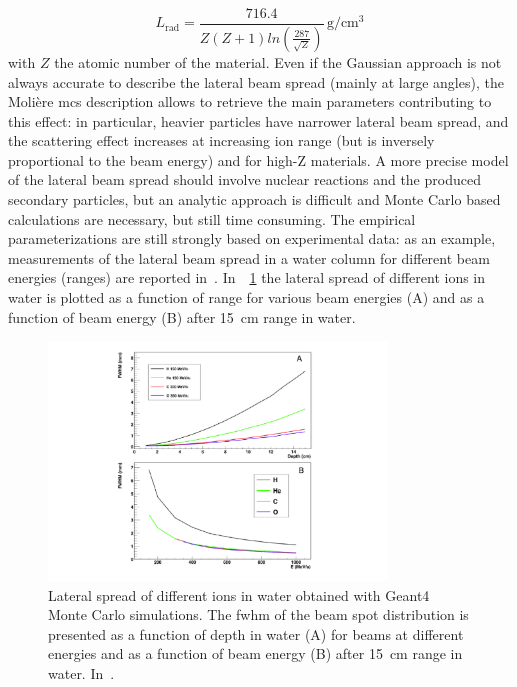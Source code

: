 \begin{equation}
L_{\mathrm{rad}} = \frac{716.4}{Z(Z+1)ln(\frac{287}{\sqrt{Z}})} \, \mathrm{g / cm^{3}}
\label{chap1::eq::radL}
\end{equation}
with $Z$ the atomic number of the material.
Even if the Gaussian approach is not always accurate to describe the lateral beam spread (mainly at large angles), the Moli\`{e}re \gls{mcs} description allows to retrieve the main parameters contributing to this effect: in particular, heavier particles have narrower lateral beam spread, and the scattering effect increases at increasing ion range (but is inversely proportional to the beam energy) and for high-Z materials. A more precise model of the lateral beam spread should involve nuclear reactions and the produced secondary particles, but an analytic approach is difficult and Monte Carlo based calculations are necessary, but still time consuming. The empirical parameterizations are still strongly based on experimental data: as an example, measurements of the lateral beam spread in a water column for different beam energies (ranges) are reported in~\cite{Pedroni2005}. In~\figurename~\ref{chap1::fig::latSpread} the lateral spread of different ions in water is plotted as a function of range for various beam energies (A) and as a function of beam energy (B) after 15~cm range in water.

\begin{figure}[!htbp]
\centering
\includegraphics[width=0.8\textwidth]{03_GraphicFiles/chapter1_Introduction/lateralSpread.pdf}
\caption{Lateral spread of different ions in water obtained with Geant4 Monte Carlo simulations. The \gls{fwhm} of the beam spot distribution is presented as a function of depth in water (A) for beams at different energies and as a function of beam energy (B) after 15~cm range in water. In~\cite{Durante2016}.}
\label{chap1::fig::latSpread}
\end{figure}   

